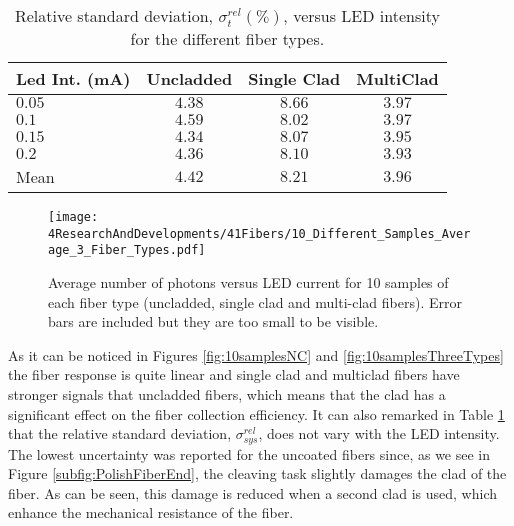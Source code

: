 \begin{table}[h]
\centering{}%
\begin{tabular}{lccc}
\toprule 
Led Int. (mA) & Uncladded & Single Clad & MultiClad \tabularnewline
\midrule
\midrule 
$0.05$ & $4.38$ & $8.66$ & $3.97$ \tabularnewline
$0.1$ & $4.59$ & $8.02$ & $3.97$ \tabularnewline
$0.15$ & $4.34$ & $8.07$ & $3.95$ \tabularnewline
$0.2$ & $4.36$ & $8.10$ & $3.93$ \tabularnewline
Mean & $4.42$ & $8.21$ & $3.96$ \tabularnewline
\bottomrule
\end{tabular}
\caption{Relative standard deviation, $\sigma^{rel}_t(\%)$, versus LED intensity for the different fiber types.}
\label{tab:RelativeStandardDeviation3FiberTypes}
\end{table}

\begin{figure}[h]
\centering
\texttt{[image: 4ResearchAndDevelopments/41Fibers/10\_Different\_Samples\_Average\_3\_Fiber\_Types.pdf]}
\caption{Average number of photons versus LED current for 10 samples of each fiber type (uncladded, single clad and multi-clad fibers). Error bars are included but they are too small to be visible.\label{fig:AveregeThreeFiberTypes}}
\end{figure}

As it can be noticed in Figures \ref{fig:10samplesNC} and \ref{fig:10samplesThreeTypes} the fiber response is quite linear and single clad and multiclad fibers have stronger signals that uncladded fibers, which means that the clad has a significant effect on the fiber collection efficiency. It can also remarked in Table \ref{tab:RelativeStandardDeviation3FiberTypes} that the relative standard deviation, $\sigma^{rel}_{sys}$, does not vary with the LED intensity. The lowest uncertainty was reported for the uncoated fibers since, as we see in Figure \ref{subfig:PolishFiberEnd}, the cleaving task slightly damages the clad of the fiber. As can be seen, this damage is reduced when a second clad is used, which enhance the mechanical resistance of the fiber.



